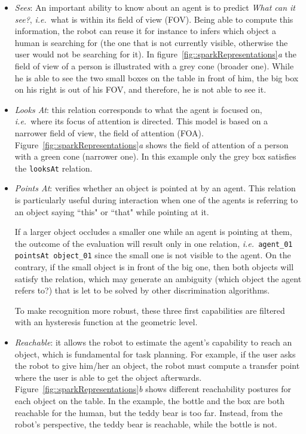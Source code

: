 \documentclass[a4paper]{article}
\newcommand{\ie}{{\textit{i.e.\ }}}
\begin{document}
\begin{itemize}

\item \emph{Sees}: An important ability to know about an agent is to predict
\emph{What can it see?}, \ie what is within its field of view (FOV). Being able
to compute this information, the robot can reuse it for instance to infers
which object a human is searching for (the one that is not currently visible,
otherwise the user would not be searching for it).  In
figure~\ref{fig::sparkRepresentations}\emph{a} the field of view of a person is
illustrated with a grey cone (broader one). While he is able to see the two
small boxes on the table in front of him, the big box on his right is out of
his FOV, and therefore, he is not able to see it. 

\item \emph{Looks At}: this relation corresponds to what the agent is focused
on, \ie where its focus of attention is directed. This model is based on a
narrower field of view, the field of attention (FOA). 
Figure~\ref{fig::sparkRepresentations}\emph{a}
shows the field of attention of a person with a green cone (narrower one). In
this example only the grey box satisfies the \texttt{looksAt} relation.

\item \emph{Points At}: verifies whether an object is pointed at by an agent.
This relation is particularly useful during interaction when one of the agents
is referring to an object saying ``this" or ``that" while pointing at it.
 
If a larger object occludes a smaller one while an agent is pointing at them, the
outcome of the evaluation will result only in one relation, \ie \texttt{agent\_01
pointsAt object\_01} since the small one is not visible to the agent.  On the
contrary, if the small object is in front of the big one, then both objects
will satisfy the relation, which may generate an ambiguity (which object the
agent refers to?) that is let to be solved by other discrimination algorithms.

To make recognition more robust, these three first capabilities are filtered
with an hysteresis function at the geometric level.

\item \emph{Reachable}: it allows the robot to estimate the agent's capability
to reach an object, which is fundamental for task planning. For example, if the
user asks the robot to give him/her an object, the robot must compute a transfer
point where the user is able to get the object afterwards. 
Figure~\ref{fig::sparkRepresentations}\emph{b} shows different reachability postures for each object
on the table. In the example, the bottle and the box are both reachable for the
human, but the teddy bear is too far. Instead, from the robot's perspective,
the teddy bear is reachable, while the bottle is not.

\end{itemize}
\end{document}
